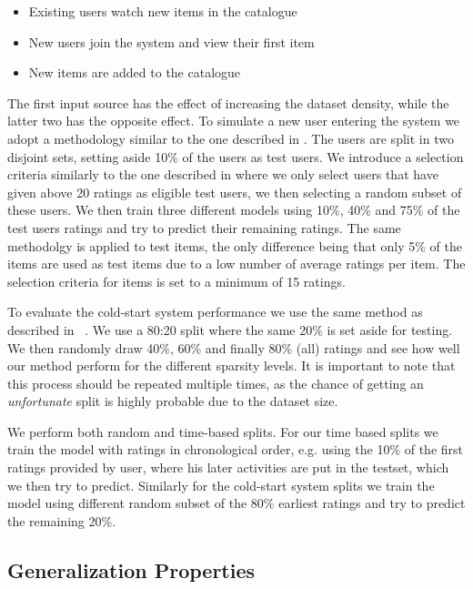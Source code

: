 \begin{itemize}
	\item 	Existing users watch new items in the catalogue
	\item	New users join the system and view their first item
	\item	New items are added to the catalogue
\end{itemize}

The first input source has the effect of increasing the dataset density, while
the latter two has the opposite effect. To simulate a new user entering the system
we adopt a methodology similar to the one described in \cite{Stern2009, Lam2008}. The
users are split in two disjoint sets, setting aside 10\% of the users as test users.
We introduce a selection criteria similarly to the one described in \cite{Rashid2002, Rashid2008}
where we only select users that have given above 20 ratings as eligible test users,
we then selecting a random subset of these users.
We then train three different models using 10\%, 40\% and 75\% of the test users
ratings and try to predict their remaining ratings. The same methodolgy is applied
to test items, the only difference being that only 5\% of the items are used as 
test items due to a low number of average ratings per item. The selection criteria
for items is set to a minimum of 15 ratings.

To evaluate the cold-start system performance we use the same method as
described in ~\cite{Agarwal2009}. We use a 80:20 split where the same 20\% is set
aside for testing. We then randomly draw 40\%, 60\% and finally 80\% (all) ratings
and see how well our method perform for the different sparsity levels.
It is important to note that this process should be repeated multiple times, as
the chance of getting an \emph{unfortunate} split is highly probable due to the
dataset size.

We perform both random and time-based splits. For our time based splits we train
the model with ratings in chronological order, e.g. using the 10\% of the first
ratings provided by user, where his later activities are put in the testset, which
we then try to predict. Similarly for the cold-start system splits we train the model
using different random subset of the 80\% earliest ratings and try to predict the remaining 20\%.

\subsection{Generalization Properties}

